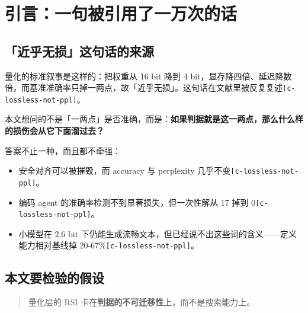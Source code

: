 \section{引言：一句被引用了一万次的话}

\subsection{「近乎无损」这句话的来源}

量化的标准叙事是这样的：把权重从 16 bit 降到 4 bit，显存降四倍、延迟降数倍，而基准准确率只掉一两点，故「近乎无损」。这句话在文献里被反复复述{\scriptsize\texttt{[c-\hspace{0pt}lossless-\hspace{0pt}not-\hspace{0pt}ppl]}}。


本文想问的不是「一两点」是否准确，而是：\textbf{如果判据就是这一两点，那么什么样的损伤会从它下面溜过去？}


答案不止一种，而且都不牵强：


\begin{itemize}
  \item 安全对齐可以被摧毁，而 accuracy 与 perplexity 几乎不变{\scriptsize\texttt{[c-\hspace{0pt}lossless-\hspace{0pt}not-\hspace{0pt}ppl]}}。
  \item 编码 agent 的准确率检测不到显著损失，但一次性解从 17 掉到 0{\scriptsize\texttt{[c-\hspace{0pt}lossless-\hspace{0pt}not-\hspace{0pt}ppl]}}。
  \item 小模型在 2.6 bit 下仍能生成流畅文本，但已经说不出这些词的含义——定义能力相对基线掉 20-\hspace{0pt}67\%{\scriptsize\texttt{[c-\hspace{0pt}lossless-\hspace{0pt}not-\hspace{0pt}ppl]}}。
\end{itemize}

\subsection{本文要检验的假设}

\begin{quote}\small
量化层的 RSI 卡在\textbf{判据的不可迁移性}上，而不是搜索能力上。

\end{quote}

